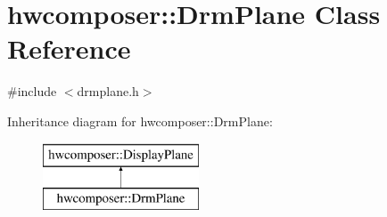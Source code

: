 \hypertarget{classhwcomposer_1_1DrmPlane}{}\section{hwcomposer\+:\+:Drm\+Plane Class Reference}
\label{classhwcomposer_1_1DrmPlane}


{\ttfamily \#include $<$drmplane.\+h$>$}

Inheritance diagram for hwcomposer\+:\+:Drm\+Plane\+:\begin{figure}[H]
\begin{center}
\leavevmode
\includegraphics[height=2.000000cm]{classhwcomposer_1_1DrmPlane}
\end{center}
\end{figure}
